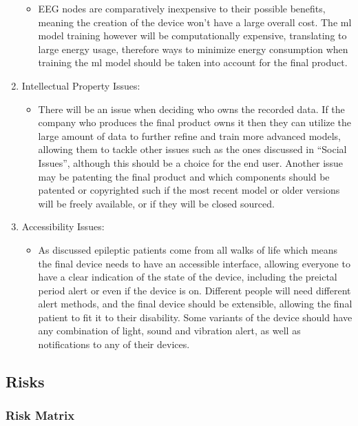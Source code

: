 \documentclass[12pt]{article}
\begin{document}
\begin{enumerate}
    \begin{itemize}
    	 \item EEG nodes are comparatively inexpensive to their possible benefits, meaning the creation of the device won't have a large overall cost. The \acrshort{ml} model training however will be computationally expensive, translating to large energy usage, therefore ways to minimize energy consumption when training the \acrshort{ml} model should be taken into account for the final product. 
    \end{itemize}
            \item Intellectual Property Issues:
    \begin{itemize}
    	 \item There will be an issue when deciding who owns the recorded data. If the company who produces the final product owns it then they can utilize the large amount of data to further refine and train more advanced models, allowing them to tackle other issues such as the ones discussed in ``Social Issues'', although this should be a choice for the end user. Another issue may be patenting the final product and which components should be patented or copyrighted such if the most recent model or older versions will be freely available, or if they will be closed sourced. 
    \end{itemize}
        \item Accessibility Issues:
    \begin{itemize}
    	 \item As discussed epileptic patients come from all walks of life which means the final device needs to have an accessible interface, allowing everyone to have a clear indication of the state of the device, including the preictal period alert or even if the device is on. Different people will need different alert methods, and the final device should be extensible, allowing the final patient to fit it to their disability. Some variants of the device should have any combination of light, sound and vibration alert, as well as notifications to any of their devices. 
    \end{itemize}
\end{enumerate}

\subsection{Risks}

\subsubsection{Risk Matrix}
\end{document}
